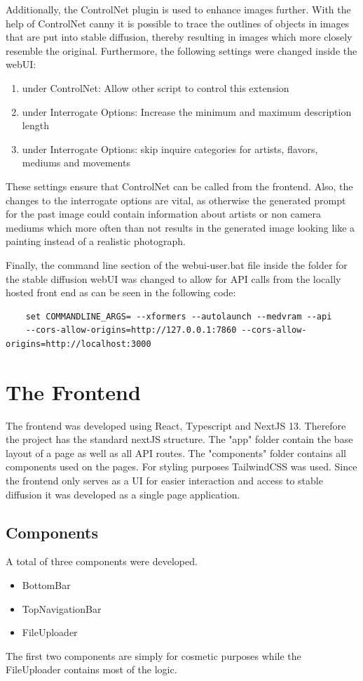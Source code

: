\documentclass[english,notitlepage,smartquotes]{hgbreport}
\begin{document}
Additionally, the ControlNet plugin \cite{controllNet} is used to enhance images further. With the help of ControlNet canny it is possible to trace the outlines of objects in images that are put into stable diffusion, thereby resulting in images which more closely resemble the original.
Furthermore, the following settings were changed inside the webUI:
\begin{enumerate}
    \item under ControlNet: Allow other script to control this extension
    \item under Interrogate Options: Increase the minimum and maximum description length 
    \item under Interrogate Options: skip inquire categories for artists, flavors, mediums and movements 
\end{enumerate}
These settings ensure that ControlNet can be called from the frontend. Also, the changes to the interrogate options are vital, as otherwise the generated prompt for the past image could contain information about artists or non camera mediums which more often than not results in the generated image looking like a painting instead of a realistic photograph.

Finally, the command line section of the webui-user.bat file inside the folder for the stable diffusion webUI was changed to allow for API calls from the locally hosted front end as can be seen in the following code:

\begin{verbatim}
    set COMMANDLINE_ARGS= --xformers --autolaunch --medvram --api 
    --cors-allow-origins=http://127.0.0.1:7860 --cors-allow-origins=http://localhost:3000
\end{verbatim}

\section{The Frontend}
The frontend was developed using React, Typescript and NextJS 13. Therefore the project has the standard nextJS structure. The "app" folder contain the base layout of a page as well as all API routes. The "components" folder contains all components used on the pages. For styling purposes TailwindCSS was used. Since the frontend only serves as a UI for easier interaction and access to stable diffusion it was developed as a single page application.

\subsection{Components}
A total of three components were developed. \begin{itemize}
    \item BottomBar 
    \item TopNavigationBar
    \item FileUploader
\end{itemize}
The first two components are simply for cosmetic purposes while the FileUploader contains most of the logic.
\end{document}
